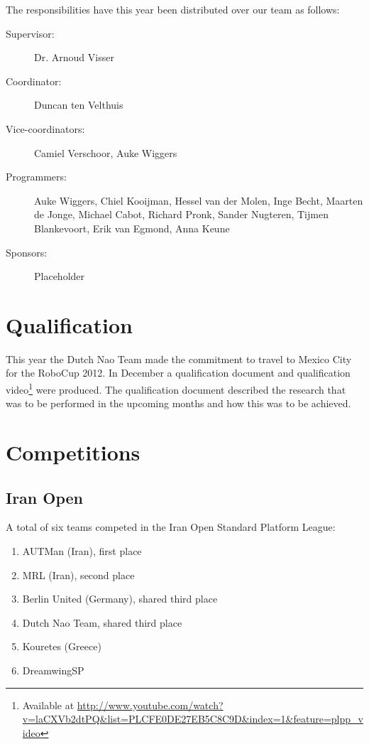 \documentclass[11pt,a4paper,oneside]{article}
\begin{document}
The responsibilities have this year been distributed over our team as follows:
\begin{description}
\item[Supervisor:] Dr. Arnoud Visser %
\item[Coordinator:] Duncan ten Velthuis
\item[Vice-coordinators:] Camiel Verschoor, Auke Wiggers
\item[Programmers:] Auke Wiggers, Chiel Kooijman, Hessel van der Molen, Inge
    Becht, Maarten de Jonge, Michael Cabot, Richard Pronk, Sander Nugteren,
    Tijmen Blankevoort, Erik van Egmond, Anna Keune
\item[Sponsors:] Placeholder
\end{description}

\section{Qualification}
This year the Dutch Nao Team made the commitment to travel to Mexico City for the RoboCup 2012. In December a qualification document \cite{DutchNaoTeamQualification} and qualification video\footnote{Available at \url{http://www.youtube.com/watch?v=laCXVb2dtPQ&list=PLCFE0DE27EB5C8C9D&index=1&feature=plpp_video}} were produced. The qualification document described the research that was to be performed in the upcoming months and how this was to be achieved.

\section{Competitions}

\subsection{Iran Open}

A total of six teams competed in the Iran Open Standard Platform League:
\begin{enumerate}
\item AUTMan (Iran), first place
\item MRL (Iran), second place
\item Berlin United (Germany), shared third place
\item Dutch Nao Team, shared third place
\item Kouretes (Greece)
\item DreamwingSP
\end{enumerate}
\end{document}
